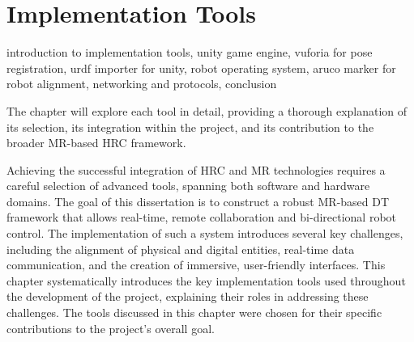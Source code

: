 











\chapter{Implementation Tools}%
\label{chapter:tools}


introduction to implementation tools, unity game engine, vuforia for pose registration, urdf importer for unity, robot operating system, aruco marker for robot alignment, networking and protocols, conclusion

The chapter will explore each tool in detail, providing a thorough explanation of its selection, its integration within the project, and its contribution to the broader \ac{MR}-based \ac{HRC} framework.


Achieving the successful integration of \ac{HRC} and \ac{MR} technologies requires a careful selection of advanced tools, spanning both software and hardware domains. The goal of this dissertation is to construct a robust \ac{MR}-based \ac{DT} framework that allows real-time, remote collaboration and bi-directional robot control. The implementation of such a system introduces several key challenges, including the alignment of physical and digital entities, real-time data communication, and the creation of immersive, user-friendly interfaces. This chapter systematically introduces the key implementation tools used throughout the development of the project, explaining their roles in addressing these challenges. 
The tools discussed in this chapter were chosen for their specific contributions to the project’s overall goal. 

